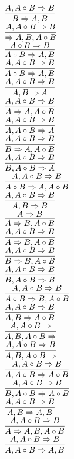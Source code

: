 \documentclass[11pt]{article}
\begin{document}
\begin{center}
\bigskip
\\$\infer{B\Rightarrow A, B}{A, A\circ B\Rightarrow B}$
\bigskip
\\$\infer{\Rightarrow A, B, A\circ B}{A, A\circ B\Rightarrow B}$
\bigskip
\\$\infer{A\circ B\Rightarrow A, B}{A\circ B\Rightarrow B}$
\bigskip
\\$\infer{A\circ B\Rightarrow A, B}{A, A\circ B\Rightarrow B}$
\bigskip
\\$\infer{A, B\Rightarrow A}{A, A\circ B\Rightarrow B}$
\bigskip
\\$\infer{A\Rightarrow A, A\circ B}{A, A\circ B\Rightarrow B}$
\bigskip
\\$\infer{A, A\circ B\Rightarrow A}{A, A\circ B\Rightarrow B}$
\bigskip
\\$\infer{B\Rightarrow A, A\circ B}{A, A\circ B\Rightarrow B}$
\bigskip
\\$\infer{B, A\circ B\Rightarrow A}{A, A\circ B\Rightarrow B}$
\bigskip
\\$\infer{A\circ B\Rightarrow A, A\circ B}{A, A\circ B\Rightarrow B}$
\bigskip
\\$\infer{A, B\Rightarrow B}{A, A\circ B\Rightarrow B}$
\bigskip
\\$\infer{A\Rightarrow B, A\circ B}{A\Rightarrow B}$
\bigskip
\\$\infer{A\Rightarrow B, A\circ B}{A, A\circ B\Rightarrow B}$
\bigskip
\\$\infer{B\Rightarrow B, A\circ B}{A, A\circ B\Rightarrow B}$
\bigskip
\\$\infer{B, A\circ B\Rightarrow B}{A, A\circ B\Rightarrow B}$
\bigskip
\\$\infer{A\circ B\Rightarrow B, A\circ B}{A, A\circ B\Rightarrow B}$
\bigskip
\\$\infer{A, B\Rightarrow A\circ B}{A, A\circ B\Rightarrow B}$
\bigskip
\\$\infer{A, B, A\circ B\Rightarrow }{A, A\circ B\Rightarrow }$
\bigskip
\\$\infer{A, B, A\circ B\Rightarrow }{A, A\circ B\Rightarrow B}$
\bigskip
\\$\infer{A, A\circ B\Rightarrow A\circ B}{A, A\circ B\Rightarrow B}$
\bigskip
\\$\infer{B, A\circ B\Rightarrow A\circ B}{A, A\circ B\Rightarrow B}$
\bigskip
\\$\infer{A, B\Rightarrow A, B}{A, A\circ B\Rightarrow B}$
\bigskip
\\$\infer{A\Rightarrow A, B, A\circ B}{A, A\circ B\Rightarrow B}$
\bigskip
\\$\infer{A, A\circ B\Rightarrow A, B}{A, A\circ B\Rightarrow B}$

\end{center}
\end{document}
